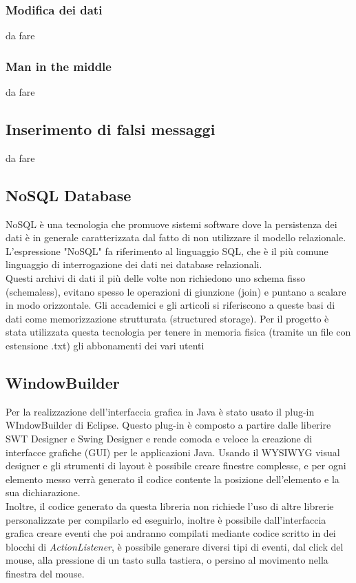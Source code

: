 \subsubsection{Modifica dei dati}
da fare
\subsubsection{Man in the middle}
da fare
\subsection{Inserimento di falsi messaggi}
da fare
\subsection{NoSQL Database}
NoSQL è una tecnologia che promuove sistemi software dove la persistenza dei dati è in generale caratterizzata dal fatto di non utilizzare il modello relazionale. L'espressione "NoSQL" fa riferimento al linguaggio SQL, che è il più comune linguaggio di interrogazione dei dati nei database relazionali.
\\Questi archivi di dati il più delle volte non richiedono uno schema fisso (schemaless), evitano spesso le operazioni di giunzione (join) e puntano a scalare in modo orizzontale. Gli accademici e gli articoli si riferiscono a queste basi di dati come memorizzazione strutturata (structured storage). Per il progetto è stata utilizzata questa tecnologia per tenere in memoria fisica (tramite un file con estensione .txt) gli abbonamenti dei vari utenti
\subsection{WindowBuilder}
Per la realizzazione dell'interfaccia grafica in Java è stato usato il plug-in WIndowBuilder di Eclipse. Questo plug-in è composto a partire dalle liberire SWT Designer e Swing Designer e rende comoda e veloce la creazione di interfacce grafiche (GUI) per le applicazioni Java. Usando il WYSIWYG visual designer e gli strumenti di layout è possibile creare finestre complesse, e per ogni elemento messo verrà generato il codice contente la posizione dell'elemento e la sua dichiarazione.
\\Inoltre, il codice generato da questa libreria non richiede l'uso di altre librerie personalizzate per compilarlo ed eseguirlo, inoltre è possibile dall'interfaccia grafica creare eventi che poi andranno compilati mediante codice scritto in dei blocchi di \textit{ActionListener}, è possibile generare diversi tipi di eventi, dal click del mouse, alla pressione di un tasto sulla tastiera, o persino al movimento nella finestra del mouse.

